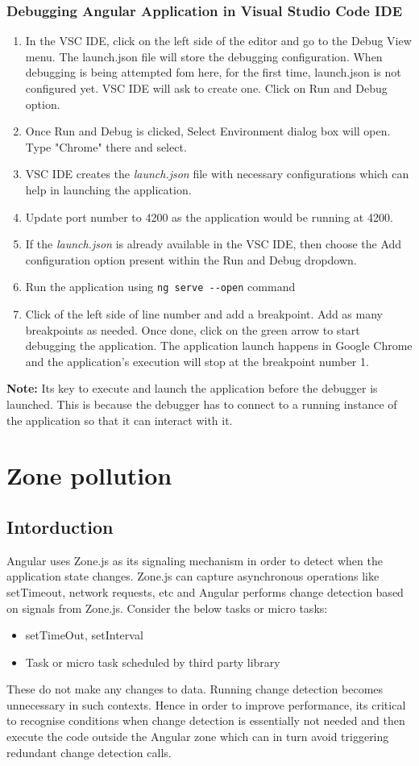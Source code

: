 \documentclass{report}
\begin{document}
\subsection{Debugging Angular Application in Visual Studio Code IDE}
\begin{enumerate}
	\item{In the VSC IDE, click on the left side of the editor and go to the Debug View menu. The launch.json file will store the debugging configuration. When debugging is being attempted fom here, for the first time, launch.json is not configured yet. VSC IDE will ask to create one. Click on Run and Debug option.}
	\item{Once Run and Debug is clicked, Select Environment dialog box will open. Type "Chrome" there and select.}
	\item{VSC IDE creates the \textit{launch.json} file with necessary configurations which can help in launching the application.}
	\item{Update port number to 4200 as the application would be running at 4200.}
	\item{If the \textit{launch.json} is already available in the VSC IDE, then choose the Add configuration option present within the Run and Debug dropdown.}
	\item{Run the application using \lstinline{ng serve --open} command}
	\item{Click of the left side of line number and add a breakpoint. Add as many breakpoints as needed. Once done, click on the green arrow to start debugging the application. The application launch happens in Google Chrome and the application’s execution will stop at the breakpoint number 1.}
\end{enumerate}
\textbf{Note:} Its key to execute and launch the application before the debugger is launched. This is because the debugger has to connect to a running instance of the application so that it can interact with it.

\chapter{Zone pollution}
\section{Intorduction}
Angular uses Zone.js as its signaling mechanism in order to detect when the application state changes. Zone.js can capture asynchronous operations like setTimeout, network requests, etc and Angular performs change detection based on signals from Zone.js.
Consider the below tasks or micro tasks:
\begin{itemize}
	\item{setTimeOut, setInterval}
	\item{Task or micro task scheduled by third party library}
\end{itemize}
These do not make any changes to data. Running change detection becomes unnecessary in such contexts. Hence in order to improve performance, its critical to recognise conditions when change detection is essentially not needed and then execute the code outside the Angular zone which can in turn avoid triggering redundant change detection calls.
\end{document}
